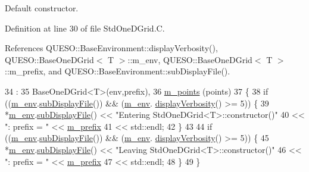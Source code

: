 Default constructor. 



Definition at line 30 of file Std\-One\-D\-Grid.\-C.



References Q\-U\-E\-S\-O\-::\-Base\-Environment\-::display\-Verbosity(), Q\-U\-E\-S\-O\-::\-Base\-One\-D\-Grid$<$ T $>$\-::m\-\_\-env, Q\-U\-E\-S\-O\-::\-Base\-One\-D\-Grid$<$ T $>$\-::m\-\_\-prefix, and Q\-U\-E\-S\-O\-::\-Base\-Environment\-::sub\-Display\-File().


\begin{DoxyCode}
34   :
35   BaseOneDGrid<T>(env,prefix),
36   \hyperlink{class_q_u_e_s_o_1_1_std_one_d_grid_ab6b505e5ffa0e77dfd0928f8d99155bd}{m\_points}              (points)
37 \{
38   \textcolor{keywordflow}{if} ((\hyperlink{class_q_u_e_s_o_1_1_base_one_d_grid_a668a0033829b907fac9e13466419b7b1}{m\_env}.\hyperlink{class_q_u_e_s_o_1_1_base_environment_a8a0064746ae8dddfece4229b9ad374d6}{subDisplayFile}()) && (\hyperlink{class_q_u_e_s_o_1_1_base_one_d_grid_a668a0033829b907fac9e13466419b7b1}{m\_env}.
      \hyperlink{class_q_u_e_s_o_1_1_base_environment_a1fe5f244fc0316a0ab3e37463f108b96}{displayVerbosity}() >= 5)) \{
39     *\hyperlink{class_q_u_e_s_o_1_1_base_one_d_grid_a668a0033829b907fac9e13466419b7b1}{m\_env}.\hyperlink{class_q_u_e_s_o_1_1_base_environment_a8a0064746ae8dddfece4229b9ad374d6}{subDisplayFile}() << \textcolor{stringliteral}{"Entering StdOneDGrid<T>::constructor()"}
40                            << \textcolor{stringliteral}{": prefix = "} << \hyperlink{class_q_u_e_s_o_1_1_base_one_d_grid_af5fa59e47fae9f6195b00e5bec8310f8}{m\_prefix}
41                            << std::endl;
42   \}
43 
44   \textcolor{keywordflow}{if} ((\hyperlink{class_q_u_e_s_o_1_1_base_one_d_grid_a668a0033829b907fac9e13466419b7b1}{m\_env}.\hyperlink{class_q_u_e_s_o_1_1_base_environment_a8a0064746ae8dddfece4229b9ad374d6}{subDisplayFile}()) && (\hyperlink{class_q_u_e_s_o_1_1_base_one_d_grid_a668a0033829b907fac9e13466419b7b1}{m\_env}.
      \hyperlink{class_q_u_e_s_o_1_1_base_environment_a1fe5f244fc0316a0ab3e37463f108b96}{displayVerbosity}() >= 5)) \{
45     *\hyperlink{class_q_u_e_s_o_1_1_base_one_d_grid_a668a0033829b907fac9e13466419b7b1}{m\_env}.\hyperlink{class_q_u_e_s_o_1_1_base_environment_a8a0064746ae8dddfece4229b9ad374d6}{subDisplayFile}() << \textcolor{stringliteral}{"Leaving StdOneDGrid<T>::constructor()"}
46                            << \textcolor{stringliteral}{": prefix = "} << \hyperlink{class_q_u_e_s_o_1_1_base_one_d_grid_af5fa59e47fae9f6195b00e5bec8310f8}{m\_prefix}
47                            << std::endl;
48   \}
49 \}
\end{DoxyCode}
